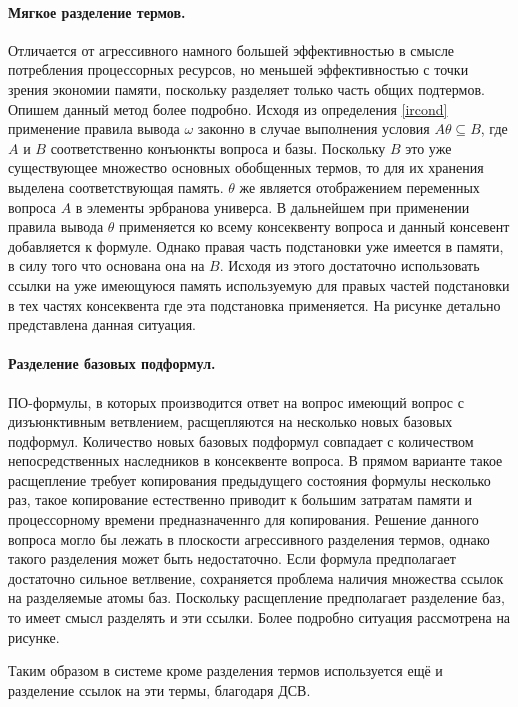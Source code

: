 \paragraph{Мягкое разделение термов.} Отличается от агрессивного намного большей эффективностью в смысле потребления процессорных ресурсов, но меньшей эффективностью с точки зрения экономии памяти, поскольку разделяет только часть общих подтермов. Опишем данный метод более подробно. Исходя из определения \ref{ircond} применение правила вывода $\omega$ законно в случае выполнения условия $A\theta \subseteq B$, где $A$ и $B$ соответственно конъюнкты вопроса и базы. Поскольку $B$ это уже существующее множество основных обобщенных термов, то для их хранения выделена соответствующая память. $\theta$ же является отображением переменных вопроса $A$ в элементы эрбранова универса. В дальнейшем при применении правила вывода $\theta$ применяется ко всему консеквенту вопроса и данный консевент добавляется к формуле. Однако правая часть подстановки уже имеется в памяти, в силу того что основана она на $B$. Исходя из этого достаточно использовать ссылки на уже имеющуюся память используемую для правых частей подстановки в тех частях консеквента где эта подстановка применяется. На рисунке детально представлена данная ситуация.

\paragraph{Разделение базовых подформул.} ПО-формулы, в которых производится ответ на вопрос имеющий вопрос с дизъюнктивным ветвлением, расщепляются на несколько новых базовых подформул. Количество новых базовых подформул совпадает с количеством непосредственных наследников в консеквенте вопроса. В прямом варианте такое расщепление требует копирования предыдущего состояния формулы несколько раз, такое копирование естественно приводит к большим затратам памяти и процессорному времени предназначеннго для копирования. Решение данного вопроса могло бы лежать в плоскости агрессивного разделения термов, однако такого разделения может быть недостаточно. Если формула предполагает достаточно сильное ветлвение, сохраняется проблема наличия множества ссылок на разделяемые атомы баз. Поскольку расщепление предполагает разделение баз, то имеет смысл разделять и эти ссылки. Более подробно ситуация рассмотрена на рисунке. 

Таким образом в системе кроме разделения термов используется ещё и разделение ссылок на эти термы, благодаря ДСВ.

